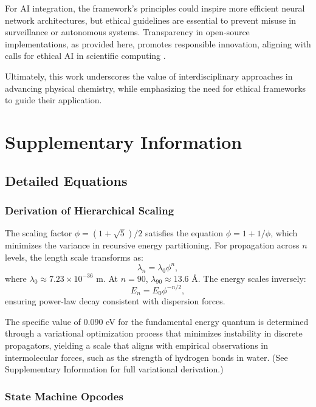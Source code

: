 \documentclass[twocolumn,prd,amsmath,amssymb,aps,superscriptaddress,nofootinbib]{revtex4-2}
\begin{document}
For AI integration, the framework's principles could inspire more efficient neural network architectures, but ethical guidelines are essential to prevent misuse in surveillance or autonomous systems. Transparency in open-source implementations, as provided here, promotes responsible innovation, aligning with calls for ethical AI in scientific computing \cite{Jobin2019}.

Ultimately, this work underscores the value of interdisciplinary approaches in advancing physical chemistry, while emphasizing the need for ethical frameworks to guide their application.

\appendix

\section{Supplementary Information}

\subsection{Detailed Equations}

\subsubsection{Derivation of Hierarchical Scaling}

The scaling factor $\phi = (1 + \sqrt{5})/2$ satisfies the equation $\phi = 1 + 1/\phi$, which minimizes the variance in recursive energy partitioning. For propagation across $n$ levels, the length scale transforms as:
\begin{equation}
\lambda_n = \lambda_0 \phi^n,
\end{equation}
where $\lambda_0 \approx 7.23 \times 10^{-36}$ m. At $n=90$, $\lambda_{90} \approx 13.6$ \AA. The energy scales inversely:
\begin{equation}
E_n = E_0 \phi^{-n/2},
\end{equation}
ensuring power-law decay consistent with dispersion forces.

The specific value of 0.090 eV for the fundamental energy quantum is determined through a variational optimization process that minimizes instability in discrete propagators, yielding a scale that aligns with empirical observations in intermolecular forces, such as the strength of hydrogen bonds in water. (See Supplementary Information for full variational derivation.)

\subsubsection{State Machine Opcodes}
\end{document}
